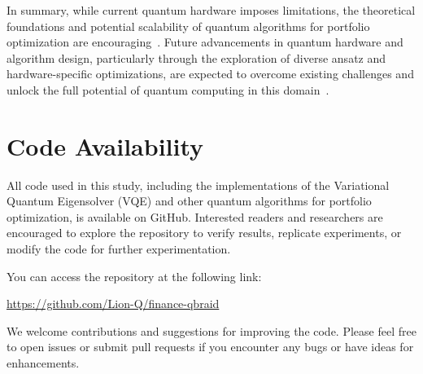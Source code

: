 \documentclass[%
 reprint,
 amsmath,amssymb,
 aps,
]{revtex4-2}
\begin{document}
In summary, while current quantum hardware imposes limitations, the theoretical foundations and potential scalability of quantum algorithms for portfolio optimization are encouraging~\cite{Woerner2019}. Future advancements in quantum hardware and algorithm design, particularly through the exploration of diverse ansatz and hardware-specific optimizations, are expected to overcome existing challenges and unlock the full potential of quantum computing in this domain~\cite{Bharti2022}.

\appendix \section*{Code Availability}

All code used in this study, including the implementations of the Variational Quantum Eigensolver (VQE) and other quantum algorithms for portfolio optimization, is available on GitHub. Interested readers and researchers are encouraged to explore the repository to verify results, replicate experiments, or modify the code for further experimentation.

You can access the repository at the following link: \begin{center} \url{https://github.com/Lion-Q/finance-qbraid} \end{center}

We welcome contributions and suggestions for improving the code. Please feel free to open issues or submit pull requests if you encounter any bugs or have ideas for enhancements.



 
\end{document}
